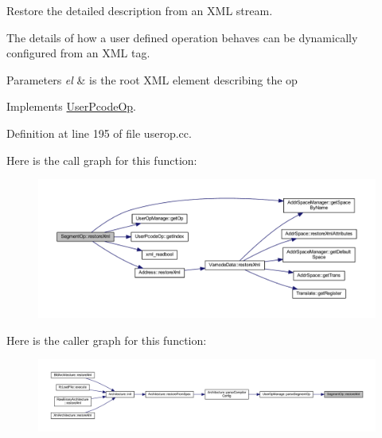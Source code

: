 Restore the detailed description from an X\+ML stream. 

The details of how a user defined operation behaves can be dynamically configured from an X\+ML tag. 
\begin{DoxyParams}{Parameters}
{\em el} & is the root X\+ML element describing the op \\
\hline
\end{DoxyParams}


Implements \mbox{\hyperlink{class_user_pcode_op_a2a7b7c637369bc4fba4604cd83a937af}{User\+Pcode\+Op}}.



Definition at line 195 of file userop.\+cc.

Here is the call graph for this function\+:
\nopagebreak
\begin{figure}[H]
\begin{center}
\leavevmode
\includegraphics[width=350pt]{class_segment_op_a6f311b351e8d30119469650d5e33f84b_cgraph}
\end{center}
\end{figure}
Here is the caller graph for this function\+:
\nopagebreak
\begin{figure}[H]
\begin{center}
\leavevmode
\includegraphics[width=350pt]{class_segment_op_a6f311b351e8d30119469650d5e33f84b_icgraph}
\end{center}
\end{figure}
\mbox{\label{class_segment_op_acb25104d3aad5e44a3c9d5b471e39c48}} 
